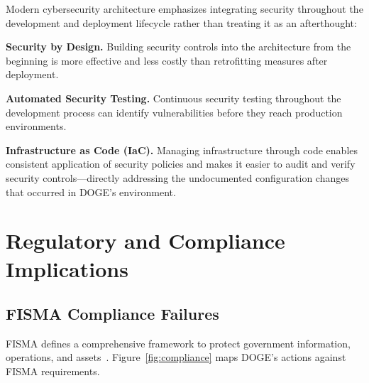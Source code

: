 \documentclass[sigconf,nonacm]{acmart}
\begin{document}
Modern cybersecurity architecture emphasizes integrating security throughout the
development and deployment lifecycle rather than treating it as an afterthought:

\textbf{Security by Design.} Building security controls into the architecture from the
beginning is more effective and less costly than retrofitting measures after deployment.

\textbf{Automated Security Testing.} Continuous security testing throughout the
development process can identify vulnerabilities before they reach production
environments.

\textbf{Infrastructure as Code (IaC).} Managing infrastructure through code enables
consistent application of security policies and makes it easier to audit and verify
security controls---directly addressing the undocumented configuration changes that
occurred in DOGE's environment.

\section{Regulatory and Compliance Implications}

\subsection{FISMA Compliance Failures}

FISMA defines a comprehensive framework to protect government information, operations,
and assets~\cite{upguard2025}. Figure~\ref{fig:compliance} maps DOGE's actions against
FISMA requirements.
\end{document}
